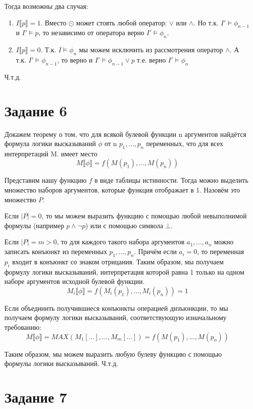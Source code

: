 \documentclass{article}
\begin{document}
Тогда возможны два случая:
\begin{enumerate}
    \item \(I \llbracket p \rrbracket = 1 \). 
    Вместо \(\odot\) может стоять любой оператор: \(\lor\) или \(\land\).
    Но т.к. \(I' \models \phi_{n-1}\) и \(I' \models p\), то независимо от оператора
    верно \(I' \models \phi_{n}\).

    \item \(I \llbracket p \rrbracket = 0 \). 
    Т.к. \(I \models \phi_n\) мы можем исключить из рассмотрения оператор \(\land\).
    А т.к. \(I' \models \phi_{n-1}\), то верно и 
    \(I' \models \phi_{n-1} \lor p\) т.е. верно 
    \(I' \models \phi_{n}\)
\end{enumerate}

Ч.т.д.

\section*{Задание 6}
Докажем теорему о том, что для всякой булевой функции n аргументов 
найдётся формула логики высказываний \(\phi\) от n \(p_1,...,p_n\) переменных, что для всех интерпретаций M.
имеет место
\[M \llbracket \phi \rrbracket = f(M(p_1), ..., M(p_n))\]

Представим нашу функцию \(f\) в виде таблицы истинности. 
Тогда можно выделить множество наборов аргументов, 
которые функция отображает в 1. Назовём это множество \(P\).

Если \(|P| = 0\), то мы можем выразить функцию с помощью 
любой невыполнимой формулы (например \(p \land \neg p\)) или с помощью символа \(\bot\).

Если \(|P| = m > 0\), то для каждого такого набора аргументов 
\(a_1,...,a_n\)
можно записать конъюнкт из переменных \(p_1,...,p_n\). 
Причём если \(a_i = 0\), то переменная \(p_i\) входит в конъюнкт со знаком отрицания.
Таким образом, мы получаем формулу логики высказываний, 
интерпретация которой равна 1 только на одном наборе аргументов исходной булевой функции.
\[M_i \llbracket \phi \rrbracket = f(M_i(p_1), ..., M_i(p_n)) = 1\]

Если объединить получившиеся конъюнкты операцией дизъюнкции, 
то мы получаем формулу логики высказываний, 
соответствующую изначальному требованию:
\[M \llbracket \phi \rrbracket = MAX(M_1[...], ..., M_m[...]) = f(M(p_1), ..., M(p_n))\]

Таким образом, мы можем выразить любую булеву функцию 
с помощью формулы логики высказываний. Ч.т.д.
\section*{Задание 7}
\end{document}
